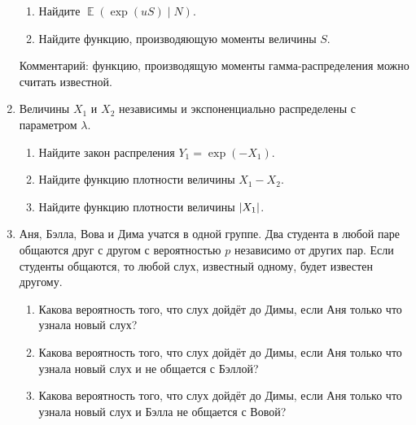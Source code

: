 \documentclass[12pt]{article}
\DeclarePairedDelimiter{\abs}{\lvert}{\rvert}
\DeclareMathOperator{\E}{\mathbb{E}}
\begin{document}
\begin{enumerate}
\begin{enumerate}
    \item Найдите $\E(\exp(u S) \mid N)$.
    \item Найдите функцию, производяющую моменты величины $S$.
\end{enumerate}

Комментарий: функцию, производящую моменты гамма-распределения можно считать известной.

\item Величины $X_1$ и $X_2$ независимы и экспоненциально распределены с параметром $\lambda$. 
\begin{enumerate}
    \item Найдите закон распреления $Y_1 = \exp(-X_1)$.
    \item Найдите функцию плотности величины $X_1 - X_2$.
    \item Найдите функцию плотности величины $\abs{X_1}$.
\end{enumerate}


\item Аня, Бэлла, Вова и Дима учатся в одной группе. 
Два студента в любой паре общаются друг с другом с вероятностью $p$ независимо от других пар.
Если студенты общаются, то любой слух, известный одному, будет известен другому. 
\begin{enumerate}
    \item Какова вероятность того, что слух дойдёт до Димы, если Аня только что узнала новый слух?
    \item Какова вероятность того, что слух дойдёт до Димы, если Аня только что узнала новый слух и не общается с Бэллой?
    \item Какова вероятность того, что слух дойдёт до Димы, если Аня только что узнала новый слух и Бэлла не общается с Вовой?
\end{enumerate}

\end{enumerate}
\end{document}
